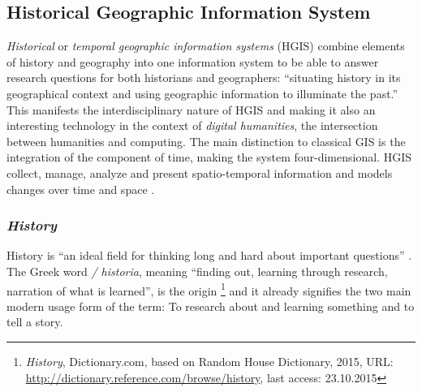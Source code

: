 





\subsection{Historical Geographic Information System} %
\label{sub:historical_geographic_information_system}

\emph{Historical} or \emph{temporal geographic information systems} (HGIS) combine elements of history and geography into one information system to be able to answer research questions for both historians and geographers: ``situating history in its geographical context and using geographic information to illuminate the past.''
\cite[p. 3]{knowles2008placing}
This manifests the interdisciplinary nature of HGIS and making it also an interesting technology in the context of \emph{digital humanities}, the intersection between humanities and computing. The main distinction to classical GIS is the integration of the component of time, making the system four-dimensional. HGIS collect, manage, analyze and present spatio-temporal information and models changes over time and space
\cite[p. xii]{knowles2002past}.


\subsubsection{\emph{History}} %

History is ``an ideal field for thinking long and hard about important questions''
\cite{ahaFiveCs}.
The Greek word \emph{\textIota\textsigma\texttau\textomikron\textrho\textiota\textalpha / historia}, meaning ``finding out, learning through research, narration of what is learned'', is the origin
\footnote{
  \textit{History},
  Dictionary.com, based on Random House Dictionary, 2015,
  URL: \url{http://dictionary.reference.com/browse/history},
  last access: 23.10.2015
}
and it already signifies the two main modern usage form of the term: To research about and learning something and to tell a story.

